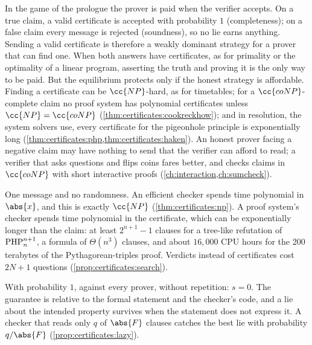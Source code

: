 \begin{refsection}
\questionone In the game of the prologue the prover is paid when the verifier accepts. On a true claim, a valid certificate is accepted with probability $1$ (completeness); on a false claim every message is rejected (soundness), so no lie earns anything. Sending a valid certificate is therefore a weakly dominant strategy for a prover that can find one. When both answers have certificates, as for primality or the optimality of a linear program, asserting the truth and proving it is the only way to be paid. But the equilibrium protects only if the honest strategy is affordable. Finding a certificate can be $\cc{NP}$-hard, as for timetables; for a $\cc{coNP}$-complete claim no proof system has polynomial certificates unless $\cc{NP}=\cc{coNP}$ (\cref{thm:certificates:cookreckhow}); and in resolution, the system solvers use, every certificate for the pigeonhole principle is exponentially long (\cref{thm:certificates:php,thm:certificates:haken}). An honest prover facing a negative claim may have nothing to send that the verifier can afford to read; a verifier that asks questions and flips coins fares better, and checks claims in $\cc{coNP}$ with short interactive proofs (\cref{ch:interaction,ch:sumcheck}).

\questiontwo One message and no randomness. An efficient checker spends time polynomial in $\abs{x}$, and this is exactly $\cc{NP}$ (\cref{thm:certificates:np}). A proof system's checker spends time polynomial in the certificate, which can be exponentially longer than the claim: at least $2^{n+1}-1$ clauses for a tree-like refutation of $\mathrm{PHP}^{n+1}_{n}$, a formula of $\Theta(n^3)$ clauses, and about $16{,}000$ CPU hours for the 200 terabytes of the Pythagorean-triples proof. Verdicts instead of certificates cost $2N+1$ questions (\cref{prop:certificates:search}).

\questionthree With probability $1$, against every prover, without repetition: $s=0$. The guarantee is relative to the formal statement and the checker's code, and a lie about the intended property survives when the statement does not express it. A checker that reads only $q$ of $\abs{F}$ clauses catches the best lie with probability $q/\abs{F}$ (\cref{prop:certificates:lazy}).



\end{refsection}
